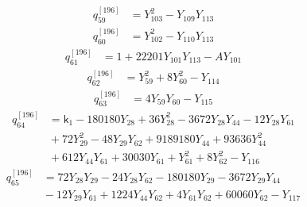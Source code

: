 \begin{equation}\label{q196:row:059}
\begin{aligned}
q_{59}^{[196]} &={} Y_{103}^{2} - Y_{109}Y_{113}
\end{aligned}
\end{equation}
\begin{equation}\label{q196:row:060}
\begin{aligned}
q_{60}^{[196]} &={} Y_{102}^{2} - Y_{110}Y_{113}
\end{aligned}
\end{equation}
\begin{equation}\label{q196:row:061}
\begin{aligned}
q_{61}^{[196]} &={} 1 + 22201Y_{101}Y_{113} - AY_{101}
\end{aligned}
\end{equation}
\begin{equation}\label{q196:row:062}
\begin{aligned}
q_{62}^{[196]} &={} Y_{59}^{2} + 8Y_{60}^{2} - Y_{114}
\end{aligned}
\end{equation}
\begin{equation}\label{q196:row:063}
\begin{aligned}
q_{63}^{[196]} &={} 4Y_{59}Y_{60} - Y_{115}
\end{aligned}
\end{equation}
\begin{equation}\label{q196:row:064}
\begin{aligned}
q_{64}^{[196]} &={} \mathsf{k}_{1} - 180180Y_{28} + 36Y_{28}^{2} - 3672Y_{28}Y_{44} - 12Y_{28}Y_{61}\\
&{} + 72Y_{29}^{2} - 48Y_{29}Y_{62} + 9189180Y_{44} + 93636Y_{44}^{2}\\
&{} + 612Y_{44}Y_{61} + 30030Y_{61} + Y_{61}^{2} + 8Y_{62}^{2} - Y_{116}
\end{aligned}
\end{equation}
\begin{equation}\label{q196:row:065}
\begin{aligned}
q_{65}^{[196]} &={} 72Y_{28}Y_{29} - 24Y_{28}Y_{62} - 180180Y_{29} - 3672Y_{29}Y_{44}\\
&{} - 12Y_{29}Y_{61} + 1224Y_{44}Y_{62} + 4Y_{61}Y_{62} + 60060Y_{62} - Y_{117}
\end{aligned}
\end{equation}
